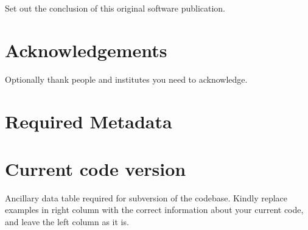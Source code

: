 \documentclass[preprint,12pt, a4paper]{elsarticle}
\begin{document}
Set out the conclusion of this original software publication.


\section*{Acknowledgements}

Optionally thank people and institutes you need to acknowledge. 




 



\section*{Required Metadata}\label{sec:metadata}


\section*{Current code version}\label{sec:src_version}

Ancillary data table required for subversion of the codebase. Kindly replace
examples in right column with the correct information about your current
code, and leave the left column as it is.
\end{document}
